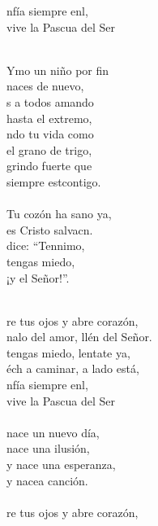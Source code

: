 \begin{cancion}
\begin{chorus}
	nfía siempre enl, \\
	vive la Pascua del Ser \\
	\end{chorus}%
	\jump\\
	Ymo un niño por fin\\
naces de nuevo,\\
	s a todos amando\\
hasta el extremo,\\
	ndo tu vida como\\
el grano de trigo,\\
	grindo fuerte que\\
	siempre estcontigo.\\
\jump\\
	Tu cozón ha sano ya,\\
	es Cristo salvacn.\\
	 dice: “Tennimo,\\
	 tengas miedo,\\
	¡y el Señor!”. \\\jump\\
	\begin{chorus}%
	re tus ojos y abre  corazón,\\
	nalo del amor, llén del Señor. \\
	 tengas miedo, lentate ya, \\
	éch a caminar, a lado está,\\
	nfía siempre enl, \\
	vive la Pascua del Ser \\
\jump\\
	 nace un nuevo día,\\
	 nace una ilusión,\\
	y nace una esperanza,\\
	y nacea canción.\\
\jump\\
	re tus ojos y abre  corazón,\\

\end{chorus}
\end{cancion}
